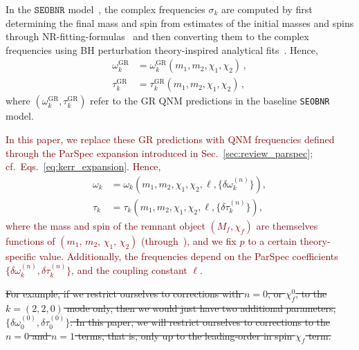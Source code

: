 \documentclass[twocolumn,
               prd,
               aps,
               superscriptaddress,
               tightenlines,
               nofootinbib,
               eqsecnum,
               amsfonts,
               amsmath,
               longbibliography]{revtex4-1}
\newcommand{\SEOB}{\texttt{SEOBNR}}
\newcommand{\ag}[1]{{\textcolor{Maroon}{{#1}} }}
\begin{document}
In the $\SEOB$ model~\cite{Mihaylov:2021bpf}, the complex frequencies
$\sigma_k$ are computed by first determining the final mass and spin from
estimates of the initial masses and spins through NR-fitting-formulas~\cite{Taracchini:2013rva,Hofmann:2016yih}
and then converting them to the complex frequencies using BH perturbation
theory-inspired analytical fits~\cite{Berti:2005ys,Berti:2009kk}.
%
Hence,
%
\begin{subequations}
\begin{align}
\omega_k^{\text{GR}} &= \omega_k^{\text{GR}}(m_1, m_2, \chi_1, \chi_2)\,,
\\
\tau _k^{\text{GR}} &= \tau _k^{\text{GR}}(m_1, m_2, \chi_1, \chi_2)\,,
\end{align}
\end{subequations}
%
where $(\omega_k^{\text{GR}}, \tau_k^{\text{GR}} )$ refer to the
GR QNM predictions in the baseline \SEOB{} model.

\ag{In this paper, we replace these GR predictions with QNM 
frequencies defined through the ParSpec expansion introduced in 
Sec.~\ref{sec:review_parspec}; cf.~Eqs.~\eqref{eq:kerr_expansion}. Hence,}
%
\begin{subequations}
\begin{align}
\omega_k &= \omega_k(m_1, m_2, \chi_1, \chi_2,\ell, \{\delta \omega_k^{(n)}\}),\\
\tau_k   &= \tau _k(m_1, m_2, \chi_1, \chi_2, \ell, \{\delta \tau_k^{(n)}\}),
\end{align}
\end{subequations}
%
\ag{where the mass and spin of the remnant object $(M_f,\chi_f)$ are themselves functions of
$(m_1,\, m_2,\, \chi_1,\, \chi_2)$ (through~\cite{Taracchini:2013rva,Hofmann:2016yih}), and we fix $p$
to a certain theory-specific value. Additionally,  the frequencies depend on the ParSpec coefficients $\{\delta
\omega_k^{(n)},\delta \tau_k^{(n)}\}$,  and the coupling constant $\ell$.}

\sout{For example, if we restrict ourselves to corrections with $n=0$, or
$\chi_f^0$, to the $k=(2,2,0)$ mode only, then we would just have two
additional parameters, $\{\delta \omega_0^{(0)}, \delta \tau_0^{(0)}\}$.
%
In this paper, we will restrict ourselves to corrections to the $n=0$ and
$n=1$ terms, that is, only up to the leading-order in spin $\chi_f$ term.}
\end{document}
